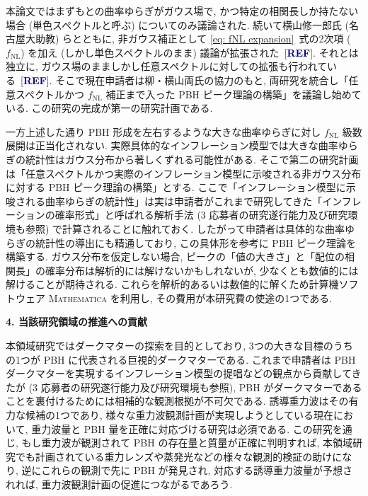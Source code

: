 \documentclass[11pt,a4paper,uplatex,dvipdfmx]{ujarticle} 		%
\newcommand{\研究課題名}{曲率ゆらぎの統計と原始ブラックホール量の精密対応}
\newcommand{\研究機関名}{名古屋大学}
\newcommand{\研究代表者氏名}{多田祐一郎}
\newcommand{\研究期間の最終元号年度}{4}  %
\newcommand{\fNL}{f_\mathrm{NL}}
\newcommand{\Blue}[1]{\textcolor{darkblue}{\sffamily\gtfamily\bfseries #1}}
\begin{document}
本論文ではまずもとの曲率ゆらぎがガウス場で, かつ特定の相関長しか持たない場合 (単色スペクトルと呼ぶ) についてのみ議論された.
続いて横山修一郎氏 (名古屋大助教) らとともに, 非ガウス補正として \eqref{eq: fNL expansion}~式の2次項 ($\fNL$) を加え (しかし単色スペクトルのまま) 議論が拡張された~[\Blue{REF}].
それとは独立に, ガウス場のまましかし任意スペクトルに対しての拡張も行われている~[\Blue{REF}].
そこで現在申請者は柳・横山両氏の協力のもと, 両研究を統合し「任意スペクトルかつ $\fNL$ 補正まで入った PBH ピーク理論の構築」を議論し始めている.
この研究の完成が第一の研究計画である.

一方上述した通り PBH 形成を左右するような大きな曲率ゆらぎに対し $\fNL$ 級数展開は正当化されない.
実際具体的なインフレーション模型では大きな曲率ゆらぎの統計性はガウス分布から著しくずれる可能性がある.
そこで第二の研究計画は「任意スペクトルかつ実際のインフレーション模型に示唆される非ガウス分布に対する PBH ピーク理論の構築」とする.
ここで「インフレーション模型に示唆される曲率ゆらぎの統計性」は実は申請者がこれまで研究してきた「インフレーションの確率形式」と呼ばれる解析手法 (3 応募者の研究遂行能力及び研究環境も参照) で計算されることに触れておく.
したがって申請者は具体的な曲率ゆらぎの統計性の導出にも精通しており, この具体形を参考に PBH ピーク理論を構築する.
ガウス分布を仮定しない場合, ピークの「値の大きさ」と「配位の相関長」の確率分布は解析的には解けないかもしれないが,
少なくとも数値的には解けることが期待される.
これらを解析的あるいは数値的に解くため計算機ソフトウェア \textsc{Mathematica} を利用し,
その費用が本研究費の使途の1つである.




\begin{mdframed}[roundcorner=0.5zw,
	innertopmargin=0.8zw,innerbottommargin=0.8zw,
	linecolor=black!50,linewidth=0.2zw,
	backgroundcolor=black!10]
	{\bfseries\gtfamily\sffamily\large 4. 当該研究領域の推進への貢献}
\end{mdframed}

\noindent
本領域研究ではダークマターの探索を目的としており, 3つの大きな目標のうちの1つが PBH に代表される巨視的ダークマターである.
これまで申請者は PBH ダークマターを実現するインフレーション模型の提唱などの観点から貢献してきたが (3 応募者の研究遂行能力及び研究環境も参照),
PBH がダークマターであることを裏付けるためには相補的な観測根拠が不可欠である.
誘導重力波はその有力な候補の1つであり, 様々な重力波観測計画が実現しようとしている現在において,
重力波量と PBH 量を正確に対応づける研究は必須である.
この研究を通じ, もし重力波が観測されて PBH の存在量と質量が正確に判明すれば, 
本領域研究でも計画されている重力レンズや蒸発光などの様々な観測的検証の助けになり,
逆にこれらの観測で先に PBH が発見され, 対応する誘導重力波量が予想されれば, 重力波観測計画の促進につながるであろう.
\end{document}
